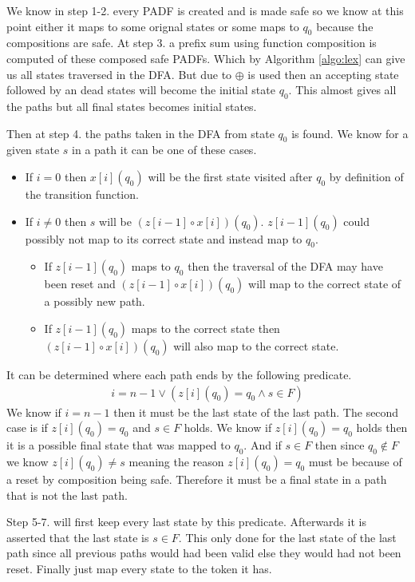 \documentclass[a4paper,12pt]{article}
\theoremstyle{definition}
\begin{document}
We know in step 1-2. every PADF is created and is made safe so we know at this point either it maps to some orignal states or some maps to $q_0$ because the compositions are safe. At step 3. a prefix sum using function composition is computed of these  composed safe PADFs. Which by Algorithm \ref{algo:lex} can give us all states traversed in the DFA. But due to $\oplus$ is used then an accepting state followed by an dead states will become the initial state $q_0$. This almost gives all the paths but all final states becomes initial states.

Then at step 4. the paths taken in the DFA from state $q_0$ is found. We know for a given state $s$ in a path it can be one of these cases.
\begin{itemize}
  \item If $i = 0$ then $x[i](q_0)$ will be the first state visited after $q_0$ by definition of the transition function.
  \item If $i \neq 0$ then $s$ will be $(z[i - 1] \circ x[i])(q_0)$. $z[i - 1](q_0)$ could possibly not map to its correct state and instead map to $q_0$.
  \begin{itemize}
    \item If $z[i - 1](q_0)$ maps to $q_0$ then the traversal of the DFA may have been reset and $(z[i - 1] \circ x[i])(q_0)$ will map to the correct state of a possibly new path.
    \item If $z[i - 1](q_0)$ maps to the correct state then $(z[i - 1] \circ x[i])(q_0)$ will also map to the correct state.
  \end{itemize}
\end{itemize}
It can be determined where each path ends by the following predicate.
\begin{align*}
  i = n - 1 \lor (z[i](q_0) = q_0 \land s \in F)
\end{align*}
We know if $i = n - 1$ then it must be the last state of the last path. The second case is if $z[i](q_0) = q_0$ and $s \in F$ holds. We know if $z[i](q_0) = q_0$ holds then it is a possible final state that was mapped to $q_0$. And if $s \in F$ then since $q_0 \notin F$ we know $z[i](q_0) \neq s$ meaning the reason $z[i](q_0) = q_0$ must be because of a reset by composition being safe. Therefore it must be a final state in a path that is not the last path.

Step 5-7. will first keep every last state by this predicate. Afterwards it is asserted that the last state is $s \in F$. This only done for the last state of the last path since all previous paths would had been valid else they would had not been reset. Finally just map every state to the token it has.
\end{document}
